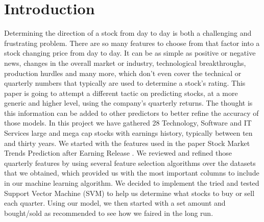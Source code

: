 \documentclass[conference]{IEEEtran}
\begin{document}
\section{Introduction}
Determining the direction of a stock from day to day is both a challenging and frustrating problem.  There are so many features to choose from that factor into a stock changing price from day to day. It can be as simple as positive or negative news, changes in the overall market or industry, technological breakthroughs, production hurdles and many more, which don't even cover the technical or quarterly numbers that typically are used to determine a stock's rating.  This paper is going to attempt a different tactic on predicting stocks, at a more generic and higher level, using the company's quarterly returns.  The thought is this information can be added to other predictors to better refine the accuracy of those models.  In this project we have gathered 28 Technology, Software and IT Services large and mega cap stocks with earnings history, typically between ten and thirty years.  We started with the features used in the paper Stock Market Trends Prediction after Earning Release  \cite{QuarterlyPrediction}.  We reviewed and refined those quarterly features by using several feature selection algorithms over the datasets that we obtained, which provided us with the most important columns to include in our machine learning algorithm.  We decided to implement the tried and tested Support Vector Machine (SVM) to help us determine what stocks to buy or sell each quarter.  Using our model, we then started with a set amount and bought/sold as recommended to see how we faired in the long run.
\end{document}
